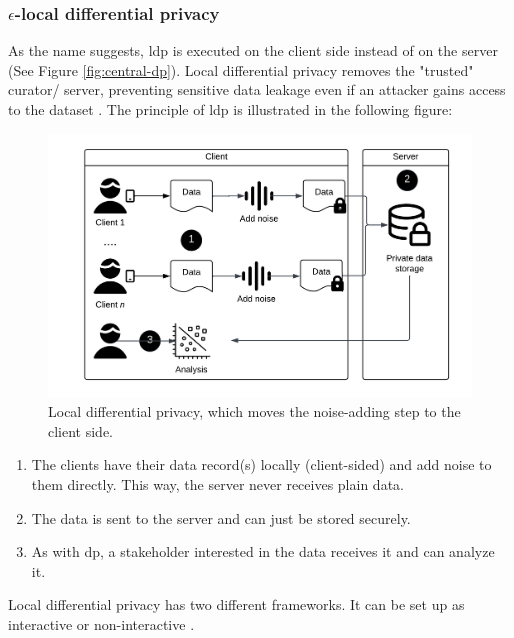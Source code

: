 \subsubsection{$\epsilon$-local differential privacy}
As the name suggests, \gls{ldp} is executed on the client side instead of on the server (See Figure \ref{fig:central-dp}).
Local differential privacy removes the "trusted" curator/ server, preventing sensitive data leakage even if an attacker gains access to the dataset \citep{del_rey_comprehensive_2020}.
The principle of \gls{ldp} is illustrated in the following figure:
\begin{figure}[H]
  \includegraphics[width=1\textwidth]{TheorethicalFramework/Differential privacy/local-dp.png}
  \caption{Local differential privacy, which moves the noise-adding step to the client side.}
  \label{fig:local-dp}
\end{figure}
\begin{enumerate}
  \item The clients have their data record(s) locally (client-sided) and add noise to them directly. This way, the server never receives plain data.
  \item The data is sent to the server and can just be stored securely.
  \item As with \gls{dp}, a stakeholder interested in the data receives it and can analyze it.
\end{enumerate}
Local differential privacy has two different frameworks.
It can be set up as interactive or non-interactive \citep{del_rey_comprehensive_2020}.
\newline
